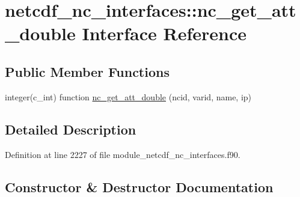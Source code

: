 \hypertarget{interfacenetcdf__nc__interfaces_1_1nc__get__att__double}{}\section{netcdf\+\_\+nc\+\_\+interfaces\+:\+:nc\+\_\+get\+\_\+att\+\_\+double Interface Reference}
\label{interfacenetcdf__nc__interfaces_1_1nc__get__att__double}
\subsection*{Public Member Functions}
\begin{DoxyCompactItemize}
\item 
integer(c\+\_\+int) function \hyperlink{interfacenetcdf__nc__interfaces_1_1nc__get__att__double_a6a3d10632aa4cc115ad79d4ec87c5b06}{nc\+\_\+get\+\_\+att\+\_\+double} (ncid, varid, name, ip)
\end{DoxyCompactItemize}


\subsection{Detailed Description}


Definition at line 2227 of file module\+\_\+netcdf\+\_\+nc\+\_\+interfaces.\+f90.



\subsection{Constructor \& Destructor Documentation}
\mbox{\label{interfacenetcdf__nc__interfaces_1_1nc__get__att__double_a6a3d10632aa4cc115ad79d4ec87c5b06}} 
